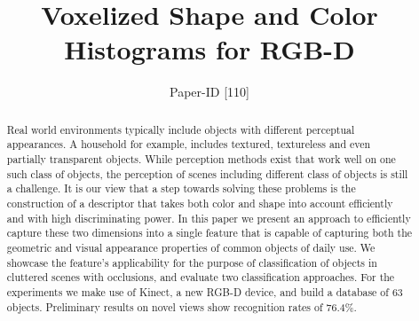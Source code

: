 \documentclass[conference]{sty/IEEEtran}
\begin{document}
\title{Voxelized Shape and Color Histograms for RGB-D}

\author{Paper-ID [110]}


\newcommand{\todo}[1]{\textbf{\textcolor{red}{TODO: #1}}}
\maketitle

\begin{abstract}
Real world environments typically include objects with different perceptual appearances.
A household for example, includes textured, textureless and even partially transparent objects.
While perception methods exist that work well on one such class of objects, the perception of
scenes including different class of objects is still a challenge.
It is our view that a step towards solving these problems is the
construction of a descriptor that takes both color and shape
into account efficiently and with high discriminating power.
In this paper we
present an approach to efficiently capture these two dimensions
into a single feature
that is capable of capturing both the geometric and visual appearance
properties of common objects of daily use. We showcase the
feature's applicability for the purpose of classification of objects in cluttered scenes with occlusions,
and evaluate two classification approaches.
For the experiments we make use of Kinect, a new RGB-D device,
and build a database of 63 objects. Preliminary results
on novel views show recognition rates of 76.4\%.
\end{abstract}
\end{document}
